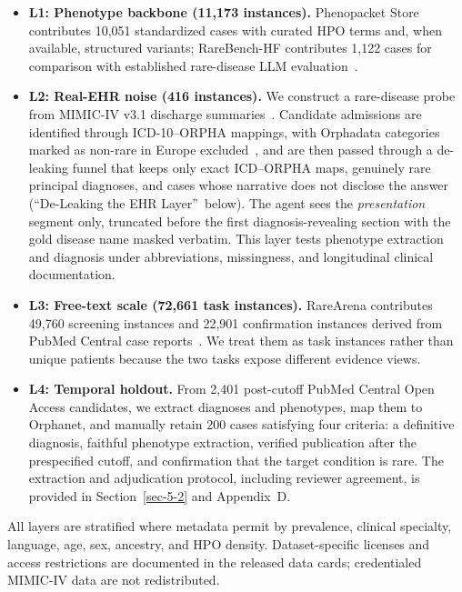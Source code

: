 \documentclass[letterpaper]{article} %
\begin{document}
\begin{itemize}
  \item \textbf{L1: Phenotype backbone (11,173 instances).} Phenopacket Store contributes 10,051 standardized cases with curated HPO terms and, when available, structured variants; RareBench-HF contributes 1,122 cases for comparison with established rare-disease LLM evaluation~\cite{danis2025phenopackets,chen2024rarebench}.
  \item \textbf{L2: Real-EHR noise (416 instances).} We construct a rare-disease probe from MIMIC-IV v3.1 discharge summaries~\cite{johnson2024mimiciv31}. Candidate admissions are identified through ICD-10--ORPHA mappings, with Orphadata categories marked as non-rare in Europe excluded~\cite{orphadata2026nomenclature}, and are then passed through a de-leaking funnel that keeps only exact ICD--ORPHA maps, genuinely rare principal diagnoses, and cases whose narrative does not disclose the answer (``De-Leaking the EHR Layer''\ below). The agent sees the \emph{presentation} segment only, truncated before the first diagnosis-revealing section with the gold disease name masked verbatim. This layer tests phenotype extraction and diagnosis under abbreviations, missingness, and longitudinal clinical documentation.
  \item \textbf{L3: Free-text scale (72,661 task instances).} RareArena contributes 49,760 screening instances and 22,901 confirmation instances derived from PubMed Central case reports~\cite{chen2026rarearena}. We treat them as task instances rather than unique patients because the two tasks expose different evidence views.
  \item \textbf{L4: Temporal holdout.} From 2,401 post-cutoff PubMed Central Open Access candidates, we extract diagnoses and phenotypes, map them to Orphanet, and manually retain 200 cases satisfying four criteria: a definitive diagnosis, faithful phenotype extraction, verified publication after the prespecified cutoff, and confirmation that the target condition is rare. The extraction and adjudication protocol, including reviewer agreement, is provided in Section~\ref{sec-5-2} and Appendix~D.
\end{itemize}

All layers are stratified where metadata permit by prevalence, clinical specialty, language, age, sex, ancestry, and HPO density. Dataset-specific licenses and access restrictions are documented in the released data cards; credentialed MIMIC-IV data are not redistributed.
\end{document}
